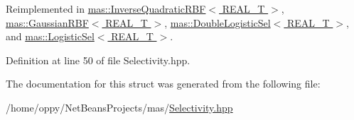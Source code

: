 Reimplemented in \hyperlink{structmas_1_1_inverse_quadratic_r_b_f_a2733866b50a4a7ae667f50334fdccc27}{mas\-::\-Inverse\-Quadratic\-R\-B\-F$<$ R\-E\-A\-L\-\_\-\-T $>$}, \hyperlink{structmas_1_1_gaussian_r_b_f_a41b0813587b13d6b62dc5eedac91cc93}{mas\-::\-Gaussian\-R\-B\-F$<$ R\-E\-A\-L\-\_\-\-T $>$}, \hyperlink{structmas_1_1_double_logistic_sel_a1f71e8df42eb1d1b7b54df4e0427d05b}{mas\-::\-Double\-Logistic\-Sel$<$ R\-E\-A\-L\-\_\-\-T $>$}, and \hyperlink{structmas_1_1_logistic_sel_a58f669fc791e7e86ef70820dbbed35ba}{mas\-::\-Logistic\-Sel$<$ R\-E\-A\-L\-\_\-\-T $>$}.



Definition at line 50 of file Selectivity.\-hpp.



The documentation for this struct was generated from the following file\-:\begin{DoxyCompactItemize}
\item 
/home/oppy/\-Net\-Beans\-Projects/mas/\hyperlink{_selectivity_8hpp}{Selectivity.\-hpp}\end{DoxyCompactItemize}
